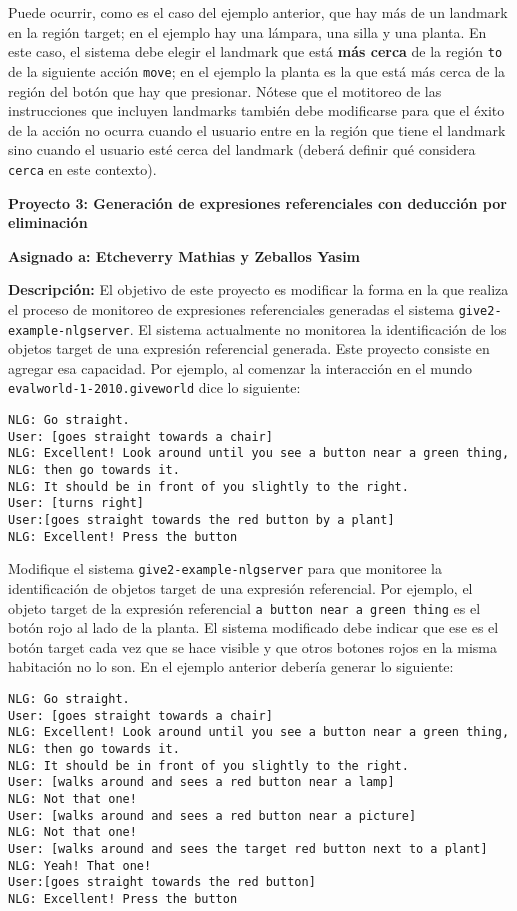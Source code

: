 \documentclass{article}
\begin{document}
Puede ocurrir, como es el caso del ejemplo anterior, que hay m\'as de un landmark en la regi\'on target; en el ejemplo hay una l\'ampara, una silla y una planta. En este caso, el sistema debe elegir el landmark que est\'a \textbf{m\'as cerca} de la regi\'on \texttt{to} de la siguiente acci\'on \texttt{move}; en el ejemplo la planta es la que est\'a m\'as cerca de la regi\'on del bot\'on que hay que presionar.  N\'otese que el motitoreo de las instrucciones que incluyen landmarks tambi\'en debe modificarse para que el \'exito de la acci\'on no ocurra cuando el usuario entre en la regi\'on que tiene el landmark sino cuando el usuario est\'e cerca del landmark (deber\'a definir qu\'e considera \texttt{cerca} en este contexto). 
 
\bigskip
\noindent
\textbf{Proyecto 3: Generaci\'on de expresiones referenciales con deducci\'on por eliminaci\'on} 

\textbf{Asignado a: Etcheverry Mathias y Zeballos Yasim} 

\textbf{Descripci\'on:}
El objetivo de este proyecto es modificar la forma en la que realiza el proceso de monitoreo de expresiones referenciales generadas el sistema \texttt{give2-example-nlgserver}. El sistema actualmente no monitorea la identificaci\'on de los objetos target de una expresi\'on referencial generada. Este proyecto consiste en agregar esa capacidad. Por ejemplo, al comenzar la interacci\'on en el mundo \texttt{evalworld-1-2010.giveworld} dice lo siguiente: 

\begin{verbatim}
NLG: Go straight. 
User: [goes straight towards a chair]
NLG: Excellent! Look around until you see a button near a green thing, 
NLG: then go towards it. 
NLG: It should be in front of you slightly to the right. 
User: [turns right]
User:[goes straight towards the red button by a plant]
NLG: Excellent! Press the button
\end{verbatim}

Modifique el sistema \texttt{give2-example-nlgserver} para que monitoree la identificaci\'on de objetos target de una expresi\'on referencial. Por ejemplo, el objeto target de la expresi\'on referencial \texttt{a button near a green thing} es el bot\'on rojo al lado de la planta. El sistema modificado debe indicar que ese es el bot\'on target cada vez que se hace visible y que otros botones rojos en la misma habitaci\'on no lo son. En el ejemplo anterior deber\'ia generar lo siguiente:

\begin{verbatim}
NLG: Go straight. 
User: [goes straight towards a chair]
NLG: Excellent! Look around until you see a button near a green thing, 
NLG: then go towards it. 
NLG: It should be in front of you slightly to the right. 
User: [walks around and sees a red button near a lamp]
NLG: Not that one!
User: [walks around and sees a red button near a picture]
NLG: Not that one!
User: [walks around and sees the target red button next to a plant]
NLG: Yeah! That one!
User:[goes straight towards the red button]
NLG: Excellent! Press the button
\end{verbatim}
\end{document}
